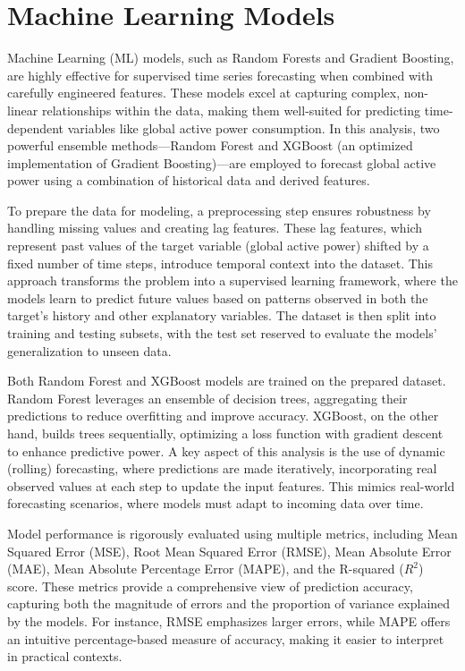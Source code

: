 	\section{Machine Learning Models}
	Machine Learning (ML) models, such as Random Forests and Gradient Boosting, are highly effective for supervised time series forecasting when combined with carefully engineered features. These models excel at capturing complex, non-linear relationships within the data, making them well-suited for predicting time-dependent variables like global active power consumption. In this analysis, two powerful ensemble methods—Random Forest and XGBoost (an optimized implementation of Gradient Boosting)—are employed to forecast global active power using a combination of historical data and derived features.
	
	To prepare the data for modeling, a preprocessing step ensures robustness by handling missing values and creating lag features. These lag features, which represent past values of the target variable (global active power) shifted by a fixed number of time steps, introduce temporal context into the dataset. This approach transforms the problem into a supervised learning framework, where the models learn to predict future values based on patterns observed in both the target’s history and other explanatory variables. The dataset is then split into training and testing subsets, with the test set reserved to evaluate the models’ generalization to unseen data.
	
	Both Random Forest and XGBoost models are trained on the prepared dataset. Random Forest leverages an ensemble of decision trees, aggregating their predictions to reduce overfitting and improve accuracy. XGBoost, on the other hand, builds trees sequentially, optimizing a loss function with gradient descent to enhance predictive power. A key aspect of this analysis is the use of dynamic (rolling) forecasting, where predictions are made iteratively, incorporating real observed values at each step to update the input features. This mimics real-world forecasting scenarios, where models must adapt to incoming data over time.
	
	Model performance is rigorously evaluated using multiple metrics, including Mean Squared Error (MSE), Root Mean Squared Error (RMSE), Mean Absolute Error (MAE), Mean Absolute Percentage Error (MAPE), and the R-squared ($R^2$) score. These metrics provide a comprehensive view of prediction accuracy, capturing both the magnitude of errors and the proportion of variance explained by the models. For instance, RMSE emphasizes larger errors, while MAPE offers an intuitive percentage-based measure of accuracy, making it easier to interpret in practical contexts.
	
